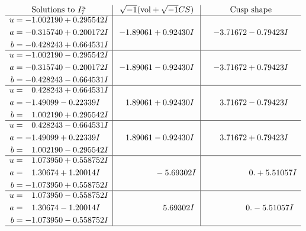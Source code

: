 \documentclass[1p]{elsarticle_modified}
\theoremstyle{definition}
\newcommand{\I}{\sqrt{-1}}
\begin{document}
$$\begin{array}{c|c|c}  
\text{Solutions to }I^u_{7}& \I (\text{vol} + \sqrt{-1}CS) & \text{Cusp shape}\\
 \hline 
\begin{aligned}
u &= -1.002190 + 0.295542 I \\
a &= -0.315740 + 0.200172 I \\
b &= -0.428243 + 0.664531 I\end{aligned}
 & -1.89061 + 0.92430 I & -3.71672 - 0.79423 I \\ \hline\begin{aligned}
u &= -1.002190 - 0.295542 I \\
a &= -0.315740 - 0.200172 I \\
b &= -0.428243 - 0.664531 I\end{aligned}
 & -1.89061 - 0.92430 I & -3.71672 + 0.79423 I \\ \hline\begin{aligned}
u &= \phantom{-}0.428243 + 0.664531 I \\
a &= -1.49099 - 0.22339 I \\
b &= \phantom{-}1.002190 + 0.295542 I\end{aligned}
 & \phantom{-}1.89061 + 0.92430 I & \phantom{-}3.71672 - 0.79423 I \\ \hline\begin{aligned}
u &= \phantom{-}0.428243 - 0.664531 I \\
a &= -1.49099 + 0.22339 I \\
b &= \phantom{-}1.002190 - 0.295542 I\end{aligned}
 & \phantom{-}1.89061 - 0.92430 I & \phantom{-}3.71672 + 0.79423 I \\ \hline\begin{aligned}
u &= \phantom{-}1.073950 + 0.558752 I \\
a &= \phantom{-}1.30674 + 1.20014 I \\
b &= -1.073950 + 0.558752 I\end{aligned}
 & \phantom{-0.000000 } -5.69302 I & \phantom{-0.000000 -}0. + 5.51057 I \\ \hline\begin{aligned}
u &= \phantom{-}1.073950 - 0.558752 I \\
a &= \phantom{-}1.30674 - 1.20014 I \\
b &= -1.073950 - 0.558752 I\end{aligned}
 & \phantom{-0.000000 -}5.69302 I & \phantom{-0.000000 } 0. - 5.51057 I\\
 \hline 
 \end{array}$$\newpage\newpage\renewcommand{\arraystretch}{1}
\end{document}
